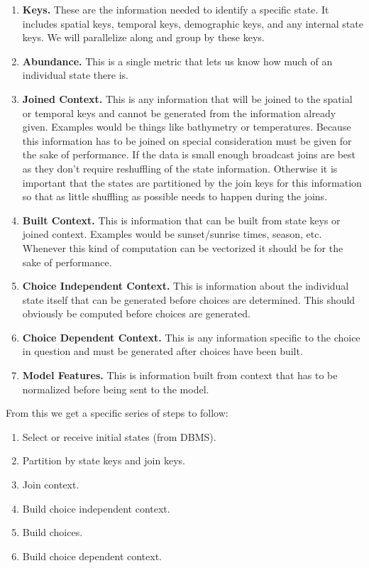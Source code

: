 \documentclass[11pt]{article}
\begin{document}
\begin{enumerate}
\item \textbf{Keys.} These are the information needed to identify a specific state. It includes spatial keys, temporal keys, demographic keys, and any internal state keys. We will parallelize along and group by these keys.
\item \textbf{Abundance.} This is a single metric that lets us know how much of an individual state there is. 
\item \textbf{Joined Context.} This is any information that will be joined to the spatial or temporal keys and cannot be generated from the information already given. Examples would be things like bathymetry or temperatures. Because this information has to be joined on special consideration must be given for the sake of performance. If the data is small enough broadcast joins are best as they don't require reshuffling of the state information. Otherwise it is important that the states are partitioned by the join keys for this information so that as little shuffling as possible needs to happen during the joins.
\item \textbf{Built Context.} This is information that can be built from state keys or joined context. Examples would be sunset/sunrise times, season, etc. Whenever this kind of computation can be vectorized it should be for the sake of performance. 
\item \textbf{Choice Independent Context.} This is information about the individual state itself that can be generated before choices are determined. This should obviously be computed before choices are generated. 
\item \textbf{Choice Dependent Context.} This is any information specific to the choice in question and must be generated after choices have been built. 
\item \textbf{Model Features.} This is information built from context that has to be normalized before being sent to the model.
\end{enumerate}

From this we get a specific series of steps to follow:

\begin{enumerate}
\item Select or receive initial states (from DBMS).
\item Partition by state keys and join keys.
\item Join context.
\item Build choice independent context.
\item Build choices.
\item Build choice dependent context.
\end{enumerate}
\end{document}
